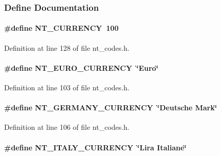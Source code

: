 \subsubsection{Define Documentation}
\paragraph[{NT\_\-CURRENCY}]{\setlength{\rightskip}{0pt plus 5cm}\#define NT\_\-CURRENCY~100}\hfill\label{nt__codes_8h_a1e3696a3f77a75a2142222c0345e6d0c}


Definition at line 128 of file nt\_\-codes.h.

\paragraph[{NT\_\-EURO\_\-CURRENCY}]{\setlength{\rightskip}{0pt plus 5cm}\#define NT\_\-EURO\_\-CURRENCY~\char`\"{}Euro\char`\"{}}\hfill\label{nt__codes_8h_a6d5e2fad48ddeb219bba1408d64adaea}


Definition at line 103 of file nt\_\-codes.h.

\paragraph[{NT\_\-GERMANY\_\-CURRENCY}]{\setlength{\rightskip}{0pt plus 5cm}\#define NT\_\-GERMANY\_\-CURRENCY~\char`\"{}Deutsche Mark\char`\"{}}\hfill\label{nt__codes_8h_a87369c0fbc97c77497ffbfcaeac5746d}


Definition at line 106 of file nt\_\-codes.h.

\paragraph[{NT\_\-ITALY\_\-CURRENCY}]{\setlength{\rightskip}{0pt plus 5cm}\#define NT\_\-ITALY\_\-CURRENCY~\char`\"{}Lira Italiane\char`\"{}}\hfill\label{nt__codes_8h_a68a6a4456958fac0c70bc9079674da5e}


